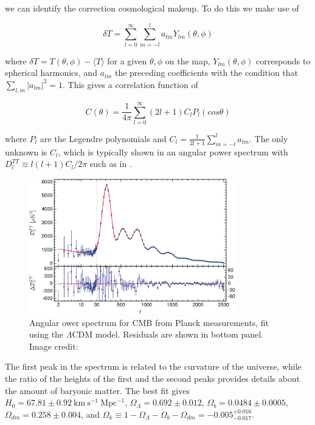 \noindent we can identify the correction cosmological makeup.  To do this we make use of

\begin{equation}
\delta T = \sum\limits_{l=0}^{\infty} \sum\limits_{m=-l}^{l} a_{lm}Y_{lm}(\theta, \phi)
\end{equation}

\noindent where $\delta T = T(\theta, \phi) - \langle T \rangle$ for a given $\theta , \phi$
on the map, $Y_{lm}(\theta, \phi)$ corresponds to spherical harmonics, and $a_{lm}$ the preceding coefficients
with the condition that $\sum\limits_{l,m} |a_{lm}|^{2} = 1$.  This gives a correlation function of

\begin{equation}
C(\theta) = \frac{1}{4 \pi} \sum\limits_{l=0}^{\infty} (2l + 1) C_{l} P_{l}(cos \theta)
\end{equation}

\noindent where $P_{l}$ are the Legendre polynomials and $C_{l} = \frac{1}{2l + 1} \sum\limits_{m=-l}^{l} a_{lm}$.  The
only unknown is $C_{l}$, which is typically shown in an angular power spectrum with
$D_{l}^{TT} \equiv l(l+1)C_{l}/2\pi$ such as in .

\begin{figure}
	\includegraphics[width=0.8\textwidth]{cmb_power_spectrum}
	\centering
	\caption{Angular ower spectrum for CMB from Planck measurements, fit using the $\Lambda$CDM model.  Residuals
	are shown in bottom panel.  Image credit: }
	\label{fig:cmb_power_spectrum}
\end{figure}

The first peak in the spectrum is related to the curvature of the universe, while the ratio of the heights of the
first and the second peaks provides details about the amount of baryonic matter.  The best fit gives
$H_{0} = 67.81 \pm 0.92\ \mathrm{km\ s^{-1}\ Mpc^{-1}}$, $\Omega_{\Lambda} = 0.692 \pm 0.012$,
$\Omega_{b} = 0.0484 \pm 0.0005$, $\Omega_{dm} = 0.258 \pm 0.004$, and
$\Omega_{k} \equiv 1 - \Omega_{\Lambda} - \Omega_{b} - \Omega_{dm} =  -0.005_{-0.017}^{+0.016}$.


